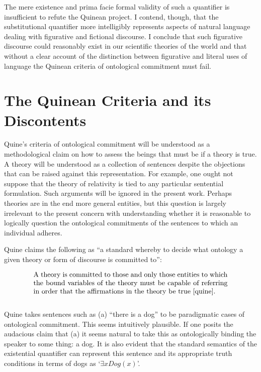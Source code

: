\documentclass[12pt,letterpaper]{article}
\newenvironment{te}
{\begin{singlespace}
\begin{equation}
\begin{minipage}[t]{0.8\linewidth}}
{\end{minipage}
\end{equation}
\end{singlespace}
\ignorespacesafterend}
\begin{document}
\begin{doublespace}
The mere existence and prima facie formal validity of such a
quantifier is insufficient to refute the Quinean project.  I contend,
though, that the substitutional quantifier more intelligibly
represents aspects of natural language dealing with figurative and
fictional discourse.  I conclude that such figurative discourse could
reasonably exist in our scientific theories of the world and that
without a clear account of the distinction between figurative and
literal uses of language the Quinean criteria of ontological
commitment must fail.


\section{The Quinean Criteria and its Discontents}

Quine's criteria of ontological commitment will be understood as a
methodological claim on how to assess the beings that must be if a
theory is true.  A theory will be understood as a collection of
sentences despite the objections that can be raised against this
representation.  For example, one ought not suppose that the theory of
relativity is tied to any particular sentential formulation. Such
arguments will be ignored in the present work. Perhaps theories are in
the end more general entities, but this question is largely irrelevant
to the present concern with understanding whether it is reasonable to
logically question the ontological commitments of the sentences to
which an individual adheres.

Quine claims the following as ``a standard whereby to decide what
ontology a given theory or form of discourse is committed to'':
\begin{te}
A theory is committed to those and only those entities to which the
bound variables of the theory must be capable of referring in order
that the affirmations in the theory be true \cite[p.13]{quine}.\\
\label{ontcommit}
\end{te}

Quine takes sentences such as (a) ``there is a dog'' to be
paradigmatic cases of ontological commitment.  This seems intuitively
plausible.  If one posits the audacious claim that (a) it seems
natural to take this as ontologically binding the speaker to some
thing: a dog. It is also evident that the standard semantics of the
existential quantifier can represent this sentence and its appropriate
truth conditions in terms of dogs as `$\exists xDog(x)$'. 


\end{doublespace}
\end{document}

